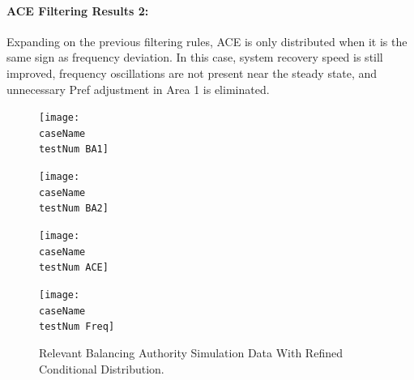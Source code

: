 \documentclass[12pt]{article}
\begin{document}
\paragraph{ACE Filtering Results 2:} Expanding on the previous filtering rules, ACE is only distributed when it is the same sign as frequency deviation. In this case, system recovery speed is still improved, frequency oscillations are not present near the steady state, and unnecessary Pref adjustment in Area 1 is eliminated.
\renewcommand{\testNum}{2}
\begin{figure}[h!]
		\centering
		\texttt{[image: \\caseName\\testNum BA1]}\vspace{-1em}
\end{figure}\vspace{-1.5em}
\begin{figure}[h!]
		\centering
		\texttt{[image: \\caseName\\testNum BA2]}\vspace{-1em}
\end{figure}\vspace{-1.5em}
\begin{figure}[h!]
		\centering
		\texttt{[image: \\caseName\\testNum ACE]}\vspace{-1em}
\end{figure}\vspace{-1.5em}
\begin{figure}[h!]
		\centering
		\texttt{[image: \\caseName\\testNum Freq]}\vspace{-1em}
		\caption{Relevant Balancing Authority Simulation Data With Refined Conditional Distribution.}
		\label{PI 2 Results}		 
\end{figure}\vspace{-1.5em}

\pagebreak
\end{document}
